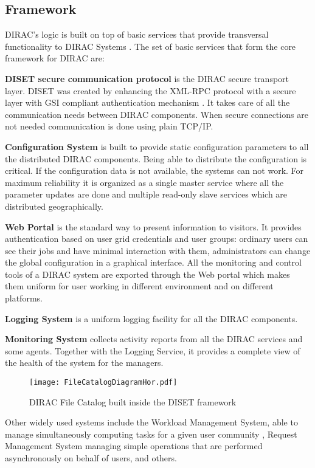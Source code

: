 \subsection{Framework}

DIRAC’s logic is built on top of basic services that provide transversal
functionality to DIRAC Systems \cite{DISET}. The set of basic services that form the core framework for
DIRAC are: 

\textbf{DISET secure communication protocol}
	is the DIRAC secure transport layer. DISET was created by enhancing the XML-RPC
	protocol with a secure layer with GSI compliant authentication mechanism \cite{DISET2}.
	It takes care of all the communication needs between DIRAC components. 
	When secure connections are not needed communication is done using plain TCP/IP.
	
\textbf{Configuration System}
	is built to provide static configuration parameters to all the distributed DIRAC components. Being able to
	distribute the configuration is critical. If the configuration data is not available, 
	the systems can not work. For maximum reliability it is organized as a single master service where 
	all the parameter updates are done and multiple read-only slave services which are distributed geographically.

\textbf{Web Portal}
	is the standard way to present information to visitors. It provides authentication based on user grid
	credentials and user groups: ordinary users can see their jobs and have minimal interaction with
	them, administrators can change the global configuration in a graphical interface.
	All the monitoring and control tools of a DIRAC system are exported through the Web portal 
	which makes them uniform for user working in different environment and on different platforms.
	
\textbf{Logging System}
	is a uniform logging facility for all the DIRAC components.

\textbf{Monitoring System}
	collects activity reports from all the DIRAC services and some agents. Together
	with the Logging Service, it provides a complete view of the health of the system for the managers.

\begin{figure}[b]
	\centering
	\texttt{[image: FileCatalogDiagramHor.pdf]}
	\caption{DIRAC File Catalog built inside the DISET framework}
	\label{fig:FCDiag}
\end{figure}

Other widely used systems include the Workload Management System, able to manage simultaneously computing
tasks for a given user community \cite{WMS}, Request Management System managing simple operations that 
are performed asynchronously on behalf of users, and others. 

